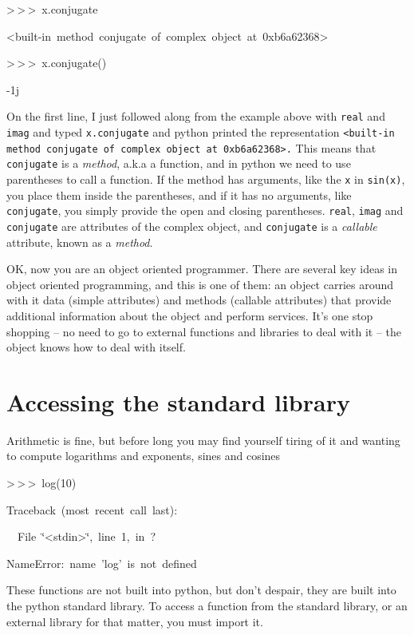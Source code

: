 \begin{lyxcode}
>\,{}>\,{}>~x.conjugate

<built-in~method~conjugate~of~complex~object~at~0xb6a62368>

>\,{}>\,{}>~x.conjugate()

-1j
\end{lyxcode}
On the first line, I just followed along from the example above with
\texttt{real} and \texttt{imag} and typed \texttt{x.conjugate} and
python printed the representation \texttt{<built-in method conjugate
of complex object at 0xb6a62368>.} This means that \texttt{conjugate}
is a \textit{method}, a.k.a a function, and in python we need to use
parentheses to call a function. If the method has arguments, like
the \texttt{x} in \texttt{sin(x)}, you place them inside the parentheses,
and if it has no arguments, like \texttt{conjugate}, you simply provide
the open and closing parentheses. \texttt{real}, \texttt{imag} and
\texttt{conjugate} are attributes of the complex object, and \texttt{conjugate}
is a \textit{callable} attribute, known as a \textit{method}.

OK, now you are an object oriented programmer. There are several key
ideas in object oriented programming, and this is one of them: an
object carries around with it data (simple attributes) and methods
(callable attributes) that provide additional information about the
object and perform services. It's one stop shopping -- no need to
go to external functions and libraries to deal with it -- the object
knows how to deal with itself.


\section[Standard Library]{Accessing the standard library}

Arithmetic is fine, but before long you may find yourself tiring of
it and wanting to compute logarithms and exponents, sines and cosines

\begin{lyxcode}
>\,{}>\,{}>~log(10)

Traceback~(most~recent~call~last):

~~File~\char`\"{}<stdin>\char`\"{},~line~1,~in~?

NameError:~name~'log'~is~not~defined
\end{lyxcode}
These functions are not built into python, but don't despair, they
are built into the python standard library. To access a function from
the standard library, or an external library for that matter, you
must import it.

